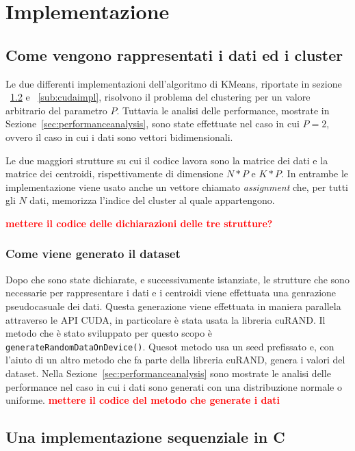 \documentclass[10pt,twocolumn,letterpaper]{article}
\newcommand\myworries[1]{\textbf{\textcolor{red}{#1}}}
\begin{document}
\section{Implementazione}
\subsection{Come vengono rappresentati i dati ed i cluster}
Le due differenti implementazioni dell'algoritmo di KMeans, riportate in sezione  ~\ref{sub:Cimpl} e ~\ref{sub:cudaimpl}, risolvono il problema del clustering per  un valore arbitrario del parametro $P$. Tuttavia le analisi delle performance, mostrate in Sezione~\ref{sec:performanceanalysis}, sono state effettuate nel caso in cui $P=2$, ovvero il caso in cui i dati sono vettori bidimensionali. \par
Le due maggiori strutture su cui il codice lavora sono la matrice dei dati e la matrice dei centroidi, rispettivamente di dimensione $N*P$ e $K*P$. In entrambe le implementazione viene usato anche un vettore chiamato \textit{assignment} che, per tutti gli $N$ dati, memorizza l'indice del cluster al quale appartengono.

\myworries{mettere il codice delle dichiarazioni delle tre strutture?}
\subsubsection{Come viene generato il dataset}
Dopo che sono state dichiarate, e successivamente istanziate, le strutture che sono necessarie per rappresentare i dati e i centroidi viene effettuata una genrazione pseudocasuale dei dati. Questa generazione viene effettuata in maniera parallela attraverso le API CUDA, in particolare è stata usata la libreria cuRAND. Il metodo che è stato sviluppato per questo scopo è \texttt{generateRandomDataOnDevice()}. Quesot metodo usa un seed prefissato e, con l'aiuto di un altro metodo che fa parte della libreria cuRAND, genera i valori del dataset. Nella Sezione~\ref{sec:performanceanalysis} sono mostrate le analisi delle performance nel caso in cui i dati sono generati con una distribuzione normale o uniforme. 
\myworries{mettere il codice del metodo che generate i dati}
\subsection{Una implementazione sequenziale in C}
\label{sub:Cimpl}
\end{document}
